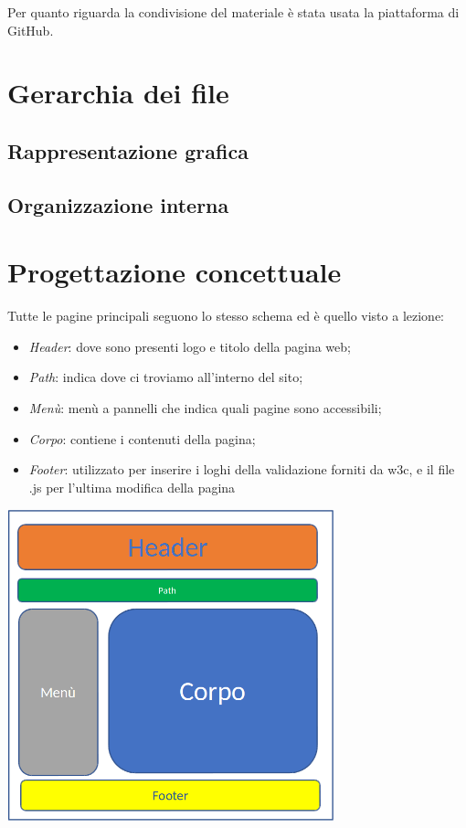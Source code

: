 \documentclass[12pt, a4paper]{article}
\begin{document}
Per quanto riguarda la condivisione del materiale è stata usata la piattaforma di GitHub.

\section{Gerarchia dei file}

\subsection{Rappresentazione grafica}

\subsection{Organizzazione interna}
 
\pagebreak %

\section{Progettazione concettuale}
Tutte le pagine principali seguono lo stesso schema ed è quello visto a lezione:
\begin{itemize}
	\item \textit{Header}: dove sono presenti logo e titolo della pagina web;
	\item \textit{Path}: indica dove ci troviamo all'interno del sito;
	\item \textit{Menù}: menù a pannelli che indica quali pagine sono accessibili;
	\item \textit{Corpo}: contiene i contenuti della pagina;
	\item \textit{Footer}: utilizzato per inserire i loghi della validazione forniti da w3c, e il file .js per l’ultima modifica della pagina
\end{itemize}

\begin{center}
	\includegraphics[height=9cm]{img/prog.png}
\end{center}
\end{document}
